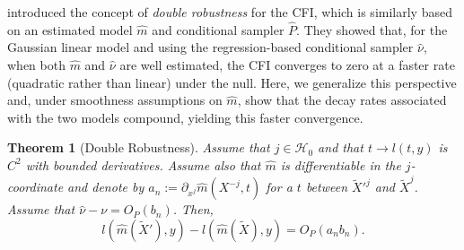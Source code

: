 \documentclass{article}
\theoremstyle{plain}
\newtheorem{theorem}{Theorem}[section]
\theoremstyle{definition}
\theoremstyle{remark}
\begin{document}
\citet{reyerolobo2025conditionalfeatureimportancerevisited} introduced the concept of \emph{double robustness} for the CFI, which is similarly based on an estimated model $\widehat{m}$ and conditional sampler $\widehat{P}$. 
%
They showed that, for the Gaussian linear model and using the regression-based conditional sampler $\widehat{\nu}$, when both $\widehat{m}$ and $\widehat{\nu}$ are well estimated, the CFI converges to zero at a faster rate (quadratic rather than linear) under the null.
Here, we generalize this perspective and, under smoothness assumptions on $\widehat{m}$, show that the decay rates associated with the two models compound, yielding this faster convergence.
%
%
 \begin{theorem}[Double Robustness]\label{thm:DR}
 Assume that $j\in \mathcal{H}_0$ and that $t\to l(t, y)$ is $C^2$ with bounded derivatives. Assume also that $\widehat{m}$ is differentiable in the $j$-coordinate and denote by $a_n:=\partial_{x^j}\widehat{m}(X^{-j}, t)$ for a $t$ between $\widetilde{X}'^{j}$ and $\widetilde{X}^j$. Assume that $\widehat{\nu}-\nu=O_P(b_n)$. Then, $$l(\widehat{m}(\widetilde{X}'), y)-l(\widehat{m}(\widetilde{X}), y)=O_P(a_n b_n).$$
 \end{theorem}
\end{document}
